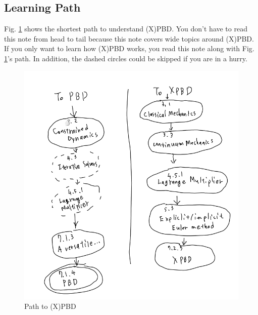\documentclass[pdflatex,sn-mathphys-num]{sn-jnl}%
\theoremstyle{thmstyleone}%
\theoremstyle{thmstyletwo}%
\theoremstyle{thmstylethree}%
\begin{document}
\subsection{Learning Path}
Fig. \ref{XPBDPath} shows the shortest path to understand (X)PBD. You don't have to read this note from head to tail because this note covers wide topics around (X)PBD. If you only want to learn how (X)PBD works, you read this note along with Fig. \ref{XPBDPath}'s path. In addition, the dashed circles could be skipped if you are in a hurry.

\begin{figure}[h]
	\centering
	\begin{minipage}[b]{0.49\columnwidth}
	\centering
\includegraphics[width=1.05\textwidth]{images/(X)PBD_path.png}
\caption{Path to (X)PBD}
\label{XPBDPath}
	\end{minipage}
	\begin{minipage}[b]{0.49\columnwidth}
	\centering

\end{minipage}
\end{figure}
\end{document}
